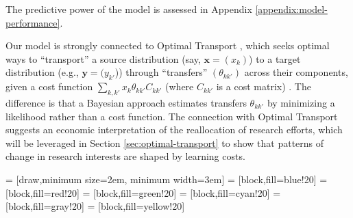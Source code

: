 \documentclass{article}
\begin{document}
The predictive power of the model is assessed in Appendix \ref{appendix:model-performance}. %

Our model is strongly connected to Optimal Transport \citep{muzellec2017tsallis,li2019learning}, which seeks optimal ways to  ``transport'' a source distribution (say, $\bm{x}=(x_k)$) to a target distribution (e.g., $\bm{y}=(y_{k'}$)) through ``transfers'' $(\theta_{kk'})$ across their components, given a cost function $\sum_{k,k'} x_{k} \theta_{kk'}C_{kk'}$ (where $C_{kk'}$ is a cost matrix) \citep{Peyr2019}. The difference is that a Bayesian approach estimates transfers $\theta_{kk'}$ by minimizing a likelihood rather than a cost function. The connection with Optimal Transport suggests an economic interpretation of the reallocation of research efforts, which will be leveraged in Section \ref{sec:optimal-transport} to show that patterns of change in research interests are shaped by learning costs. %


     = [draw,minimum size=2em, minimum width=3em]
     = [block,fill=blue!20]
     = [block,fill=red!20]
     = [block,fill=green!20]
     = [block,fill=cyan!20]
     = [block,fill=gray!20]
     = [block,fill=yellow!20]
    
\end{document}
